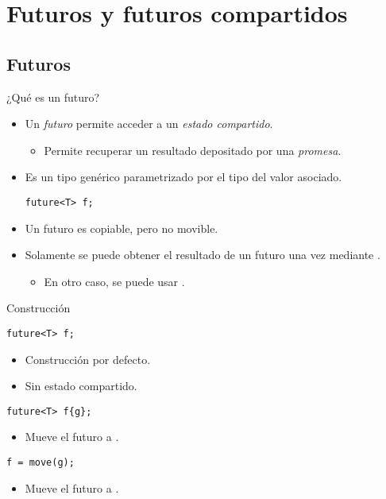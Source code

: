 \section{Futuros y futuros compartidos}

\subsection{Futuros}

\begin{frame}[fragile]{¿Qué es un futuro?}
\begin{itemize}
  \item Un \emph{futuro} permite acceder a un \emph{estado compartido}.
    \begin{itemize}
      \item Permite recuperar un resultado depositado por una \emph{promesa}.
    \end{itemize}
  \item Es un tipo genérico parametrizado por el tipo del valor asociado.
\begin{lstlisting}
future<T> f;
\end{lstlisting}
  \item Un futuro es copiable, pero no movible.
  \item Solamente se puede obtener el resultado de un futuro una vez
        mediante .
    \begin{itemize}
      \item En otro caso, se puede usar .
    \end{itemize}
\end{itemize}
\end{frame}

\begin{frame}[fragile]{Construcción}
\begin{lstlisting}
future<T> f;
\end{lstlisting}
\begin{itemize}
  \item Construcción por defecto.
  \item Sin estado compartido.
\end{itemize}

\begin{lstlisting}
future<T> f{g};
\end{lstlisting}
\begin{itemize}
  \item Mueve el futuro  a .
\end{itemize}

\begin{lstlisting}
f = move(g);
\end{lstlisting}
\begin{itemize}
  \item Mueve el futuro  a .
\end{itemize}

\end{frame}


